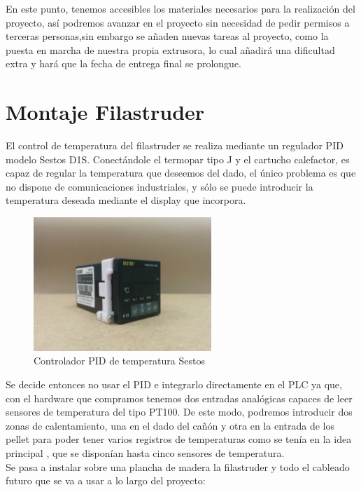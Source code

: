 En este punto, tenemos accesibles los materiales necesarios para la realización del proyecto,  así podremos avanzar en el proyecto sin necesidad de pedir permisos a terceras personas,sin embargo se añaden nuevas tareas al proyecto, como la puesta en marcha de nuestra propia extrusora, lo cual añadirá una dificultad extra y hará que la fecha de entrega final se prolongue.\\

\section{Montaje Filastruder}
\label{sec:filastruder}
El control de temperatura del filastruder se realiza mediante un regulador PID modelo Sestos D1S. Conectándole el termopar tipo J y el cartucho calefactor, es capaz de regular la temperatura que deseemos del dado, el único problema es que no dispone de comunicaciones industriales, y sólo se puede introducir la temperatura deseada mediante el display que incorpora.
   	\begin{figure}[H]
            \centering
            \includegraphics[width=0.6\textwidth]{images/filaextruder/IMG_20150814_123957.jpg}
            \caption{Controlador PID de temperatura Sestos}
            \label{fig:hardware_sestos}
    \end{figure}

Se decide entonces no usar el PID e integrarlo directamente en el PLC ya que, con el hardware que compramos tenemos dos entradas analógicas capaces de leer sensores de temperatura del tipo PT100. De este modo, podremos introducir dos zonas de calentamiento, una en el dado del cañón y otra en la entrada de los pellet para poder tener varios registros de temperaturas como se tenía en la idea principal , que se disponían hasta cinco sensores de temperatura.\\

Se pasa a instalar sobre una plancha de madera la filastruder y todo el cableado futuro que se va a usar a lo largo del proyecto:

